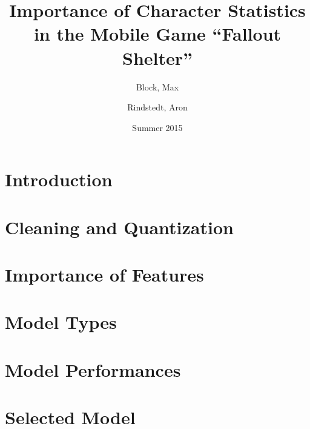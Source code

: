 \documentclass[a4paper]{article}
\title{Importance of Character Statistics in the Mobile Game ``Fallout Shelter''}
\author{Block, Max \and Rindstedt, Aron}
\date{Summer 2015}
\begin{document}
\maketitle
\thispagestyle{empty}
\tableofcontents
\eject
\section{Introduction}


\section{Cleaning and Quantization}


\section{Importance of Features}


\section{Model Types}


\section{Model Performances}


\section{Selected Model}

\end{document}
